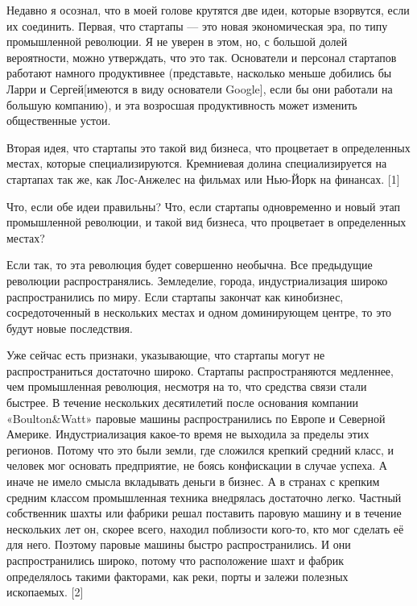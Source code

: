 \documentclass[ebook,12pt,oneside,openany]{memoir}
\begin{document}
\maketitle

Недавно я осознал, что в моей голове крутятся две идеи, которые
взорвутся, если их соединить. Первая, что стартапы — это новая
экономическая эра, по типу промышленной революции. Я не уверен в этом,
но, с большой долей вероятности, можно утверждать, что это так.
Основатели и персонал стартапов работают намного продуктивнее
(представьте, насколько меньше добились бы Ларри и Сергей[имеются в
виду основатели Google], если бы они работали на большую компанию), и
эта возросшая продуктивность может изменить общественные устои.

Вторая идея, что стартапы это такой вид бизнеса, что процветает в
определенных местах, которые специализируются. Кремниевая долина
специализируется на стартапах так же, как Лос-Анжелес на фильмах или
Нью-Йорк на финансах. [1]

Что, если обе идеи правильны? Что, если стартапы одновременно и новый
этап промышленной революции, и такой вид бизнеса, что процветает в
определенных местах?

Если так, то эта революция будет совершенно необычна. Все предыдущие
революции распространялись. Земледелие, города, индустриализация
широко распространились по миру. Если стартапы закончат как
кинобизнес, сосредоточенный в нескольких местах и одном доминирующем
центре, то это будут новые последствия.

Уже сейчас есть признаки, указывающие, что стартапы могут не
распространиться достаточно широко. Стартапы распространяются
медленнее, чем промышленная революция, несмотря на то, что средства
связи стали быстрее. В течение нескольких десятилетий после основания
компании «Boulton\&Watt» паровые машины распространились по Европе и
Северной Америке. Индустриализация какое-то время не выходила за
пределы этих регионов. Потому что это были земли, где сложился крепкий
средний класс, и человек мог основать предприятие, не боясь
конфискации в случае успеха. А иначе не имело смысла вкладывать деньги
в бизнес. А в странах с крепким средним классом промышленная техника
внедрялась достаточно легко. Частный собственник шахты или фабрики
решал поставить паровую машину и в течение нескольких лет он, скорее
всего, находил поблизости кого-то, кто мог сделать её для него.
Поэтому паровые машины быстро распространились. И они распространились
широко, потому что расположение шахт и фабрик определялось такими
факторами, как реки, порты и залежи полезных ископаемых. [2]
\end{document}
